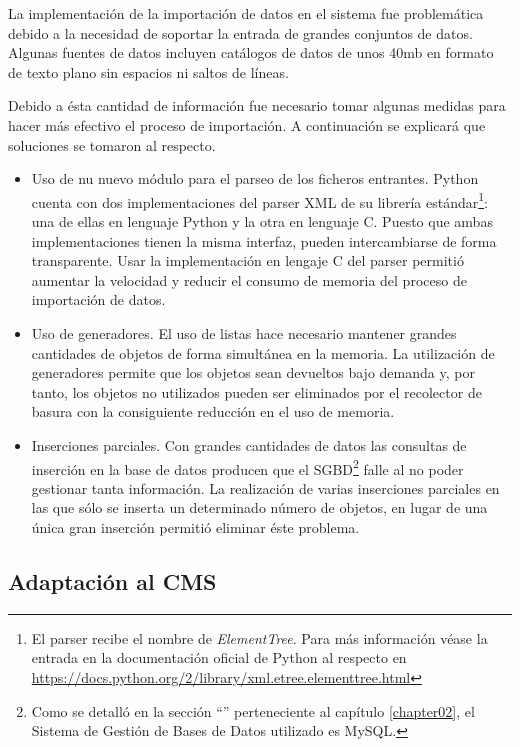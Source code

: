 		La implementación de la importación de datos en el sistema fue problemática debido a la necesidad de soportar la entrada de grandes conjuntos de datos.  Algunas fuentes de datos incluyen catálogos de datos de unos 40mb en formato de texto plano sin espacios ni saltos de líneas.
		
		Debido a ésta cantidad de información fue necesario tomar algunas medidas para hacer más efectivo el proceso de importación.  A continuación se explicará que soluciones se tomaron al respecto.
		\begin{itemize}
			\item
				Uso de nu nuevo módulo para el parseo de los ficheros entrantes.  Python cuenta con dos implementaciones del parser XML de su librería estándar\footnote{El parser recibe el nombre de \textit{ElementTree}.  Para más información véase la entrada en la documentación oficial de Python al respecto en \url{https://docs.python.org/2/library/xml.etree.elementtree.html}}: una de ellas en lenguaje Python y la otra en lenguaje C.  Puesto que ambas implementaciones tienen la misma interfaz, pueden intercambiarse de forma transparente.  Usar la implementación en lengaje C del parser permitió aumentar la velocidad y reducir el consumo de memoria del proceso de importación de datos.
			\item
				Uso de generadores.  El uso de listas hace necesario mantener grandes cantidades de objetos de forma simultánea en la memoria.  La utilización de generadores permite que los objetos sean devueltos bajo demanda y, por tanto, los objetos no utilizados pueden ser eliminados por el recolector de basura con la consiguiente reducción en el uso de memoria.
			\item
				Inserciones parciales.  Con grandes cantidades de datos las consultas de inserción en la base de datos producen que el SGBD\footnote{Como se detalló en la sección ``'' perteneciente al capítulo \ref{chapter02}, el Sistema de Gestión de Bases de Datos utilizado es MySQL.} falle al no poder gestionar tanta información.  La realización de varias inserciones parciales en las que sólo se inserta un determinado número de objetos, en lugar de una única gran inserción permitió eliminar éste problema.
		\end{itemize}
		
	\subsection{Adaptación al CMS}
	\label{implementacion:adaptacion_cms}
	
